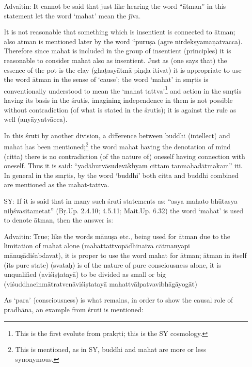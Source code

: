 Advaitin: It cannot be said that just like hearing the word “ātman” in this statement let the word ‘mahat’ mean the jīva.

It is not reasonable that something which is insentient is connected to ātman; also ātman is mentioned later by the word “puruṣa (agre nirdekṣyamāṇatvācca). Therefore since mahat is included in the group of insentient (principles) it is reasonable to consider mahat also as insentient. Just as (one says that) the essence of the pot is the clay (ghaṭasyātmā piṇḍa itivat) it is appropriate to use the word ātman in the sense of ‘cause’; the word ‘mahat’ in smṛtis is conventionally understood to mean the ‘mahat tattva’\footnote{This is the first evolute from prakṛti; this is the SY cosmology.} and action in the smṛtis having its basis in the śrutis, imagining  independence in them is not possible without contradiction (of what is stated in the śrutis); it is against the rule as well (anyāyyatvācca). 

In this śruti by another division, a difference between buddhi (intellect) and mahat has been mentioned;\footnote{This is mentioned, as in SY, buddhi and mahat are more or less synonymous.} the word mahat having the denotation of mind (citta) there is no contradiction (of the nature of) oneself having connection with oneself. Thus it is said: “yadāhurvāsudevākhyam cittam tanmahadātmakam” iti. In general in the smṛtis, by the word ‘buddhi’ both citta and buddhi combined  are mentioned as the mahat-tattva.

SY: If it is said that in many such śruti statements as: “asya mahato bhūtasya niḥśvasitametat” (Bṛ.Up. 2.4.10; 4.5.11; Mait.Up. 6.32) the word ‘mahat’ is used to denote ātman, then the answer is:

Advaitin: True; like the words mānuṣa etc., being used for ātman due to the limitation of mahat alone (mahattattvopādhinaiva cātmanyapi mānuṣādiśabdavat), it is proper to use the word mahat for ātman; ātman in itself (its pure state) (svataḥ) is of the nature of pure consciousness alone, it is unqualified (aviśiṣṭatayā) to be divided as small or big (viśuddhacinmātratvenāviśiṣtatayā mahattvālpatvavibhāgāyogāt) 

As ‘para’ (consciousness) is what remains, in order to show the causal role of pradhāna, an example from śruti is mentioned:

